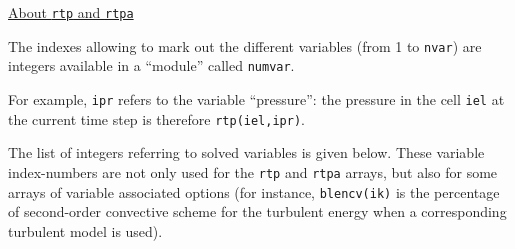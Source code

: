 {{{





\bigskip

\underline{About \texttt{rtp} and \texttt{rtpa}}

The indexes allowing to mark out the different variables (from 1 to
\texttt{nvar}) are integers available in a ``module'' called
\texttt{numvar}.

For example, \texttt{ipr} refers to the variable ``pressure'':
the pressure in the cell \texttt{iel} at the current time step is
therefore \texttt{rtp(iel,ipr)}.

The list of integers referring to solved variables is given below. These
variable index-numbers are not only used for the \texttt{rtp} and
\texttt{rtpa} arrays, but also for some arrays of variable associated options
(for instance, \texttt{blencv(ik)} is the percentage of second-order
convective scheme for the turbulent energy
when a corresponding turbulent model is used).

}}}
